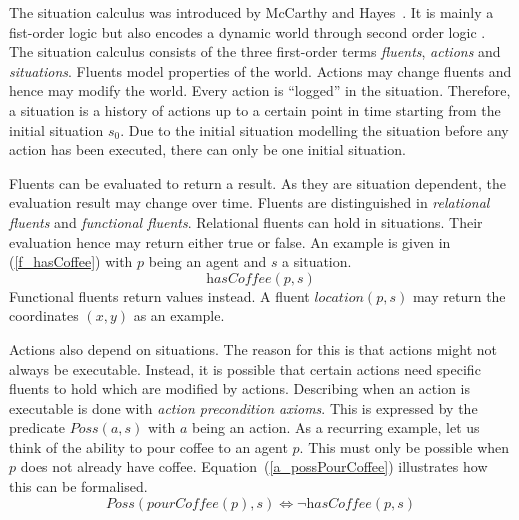 The situation calculus was introduced by McCarthy and Hayes~\cite{mccarthy_philosophical_1969}. It is mainly a fist-order logic but also encodes a dynamic world through second order logic \cite{levesque_golog:_1997}. The situation calculus consists of the three first-order terms \emph{fluents}, \emph{actions} and \emph{situations}. Fluents model properties of the world. Actions may change fluents and hence may modify the world. Every action is ``logged'' in the situation. Therefore, a situation is a history of actions up to a certain point in time starting from the initial situation $s_0$. Due to the initial situation modelling the situation before any action has been executed, there can only be one initial situation.

Fluents can be evaluated to return a result. As they are situation dependent, the evaluation result may change over time. Fluents are distinguished in \emph{relational fluents} and \emph{functional fluents}. Relational fluents can hold in situations. Their evaluation hence may return either true or false. An example is given in (\ref{f_hasCoffee}) with $p$ being an agent and $s$ a situation.
\begin{equation}\label{f_hasCoffee}
  \textit{hasCoffee}(p,s)
\end{equation}
Functional fluents return values instead. A fluent $\textit{location}(p,s)$ may return the coordinates $(x,y)$ as an example.

Actions also depend on situations. The reason for this is that actions might not always be executable. Instead, it is possible that certain actions need specific fluents to hold which are modified by actions. Describing when an action is executable is done with \emph{action precondition axioms}. This is expressed by the predicate $\textit{Poss}(a,s)$ with $a$ being an action. As a recurring example, let us think of the ability to pour coffee to an agent $p$. This must only be possible when $p$ does not already have coffee. Equation~(\ref{a_possPourCoffee}) illustrates how this can be formalised.
\begin{equation}\label{a_possPourCoffee}
  \textit{Poss}(\textit{pourCoffee}(p),s) \Leftrightarrow \neg \textit{hasCoffee}(p,s)
\end{equation}

